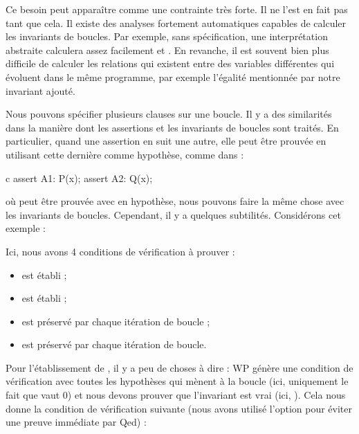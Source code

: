 


\begin{Information}
Ce besoin peut apparaître comme une contrainte très forte. Il ne l'est en fait pas
tant que cela. Il existe des analyses fortement automatiques capables de
calculer les invariants de boucles. Par exemple, sans spécification, une
interprétation abstraite calculera assez facilement  et
. En revanche, il est souvent bien plus difficile
de calculer les relations qui existent entre des variables différentes qui
évoluent dans le même programme, par exemple l'égalité mentionnée par notre
invariant ajouté.
\end{Information}


\label{l3:statements-loops-multi-inv}


Nous pouvons spécifier plusieurs clauses  sur une
boucle. Il y a des similarités dans la manière dont les assertions et les
invariants de boucles sont traités. En particulier, quand une assertion en suit
une autre, elle peut être prouvée en utilisant cette dernière comme hypothèse,
comme dans :
\begin{CodeBlock}{c}
assert A1: P(x);
assert A2: Q(x);
\end{CodeBlock}
où  peut être prouvée avec  en hypothèse, nous
pouvons faire la même chose avec les invariants de boucles. Cependant, il y a
quelques subtilités. Considérons cet exemple :




Ici, nous avons 4 conditions de vérification à prouver :
\begin{itemize}
  \item {} est établi ;
  \item {} est établi ;
  \item {} est préservé par chaque itération de boucle ;
  \item {} est préservé par chaque itération de boucle.
\end{itemize}
Pour l'établissement de , il y a peu de choses à dire : WP
génère une condition de vérification avec toutes les hypothèses qui mènent à la
boucle (ici, uniquement le fait que  vaut 0) et nous devons
prouver que l'invariant est vrai (ici, ). Cela nous donne
la condition de vérification suivante (nous avons utilisé l'option
 pour éviter une preuve immédiate par Qed) :


